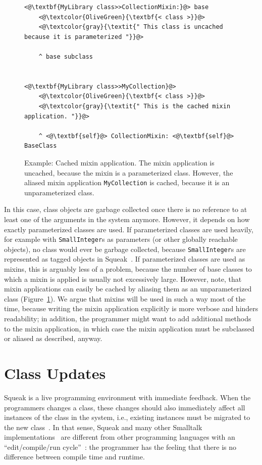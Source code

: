 \begin{figure}[!htp]
\begin{minipage}{\textwidth}
\begin{lstlisting}
<@\textbf{MyLibrary class>>CollectionMixin:}@> base
    <@\textcolor{OliveGreen}{\textbf{< class >}}@>
    <@\textcolor{gray}{\textit{" This class is uncached because it is parameterized "}}@>

    ^ base subclass


<@\textbf{MyLibrary class>>MyCollection}@>
    <@\textcolor{OliveGreen}{\textbf{< class >}}@>
    <@\textcolor{gray}{\textit{" This is the cached mixin application. "}}@>

    ^ <@\textbf{self}@> CollectionMixin: <@\textbf{self}@> BaseClass
\end{lstlisting}
\caption[Cached mixin application]{Example: Cached mixin application. The mixin application is uncached, because the mixin is a parameterized class. However, the aliased mixin application \texttt{MyCollection} is cached, because it is an unparameterized class.}
\label{fig:impl_cached_mixin_application}
\end{minipage}
\end{figure}

In this case, class objects are garbage collected once there is no reference to at least one of the arguments in the system anymore. However, it depends on how exactly parameterized classes are used. If parameterized classes are used heavily, for example with \texttt{SmallInteger}s as parameters (or other globally reachable objects), no class would ever be garbage collected, because \texttt{SmallInteger}s are represented as tagged objects in Squeak~\cite{Bolz:2008:BFO:1482373.1482382, papetechreport}. If parameterized classes are used as mixins, this is arguably less of a problem, because the number of base classes to which a mixin is applied is usually not excessively large. However, note, that mixin applications can easily be cached by aliasing them as an unparameterized class (Figure~\ref{fig:impl_cached_mixin_application}). We argue that mixins will be used in such a way most of the time, because writing the mixin application explicitly is more verbose and hinders readability; in addition, the programmer might want to add additional methods to the mixin application, in which case the mixin application must be subclassed or aliased as described, anyway.

\section{Class Updates}
Squeak is a live programming environment with immediate feedback. When the programmers changes a class, these changes should also immediately affect all instances of the class in the system, i.e., existing instances must be migrated to the new class~\cite{casaccio2011bootstrapping}. In that sense, Squeak and many other Smalltalk implementations~\cite{Penney:1987:CMG:38765.38817} are different from other programming languages with an ``edit/compile/run cycle''~\cite{conf/sofsem/NierstraszG10}: the programmer has the feeling that there is no difference between compile time and runtime.

